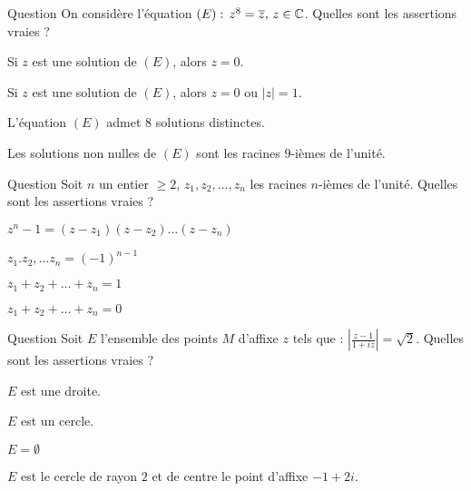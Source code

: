 \begin{multi}[multiple,feedback=
{Remarquer que si \(z\) est une solution  de \((E)\), \(|z|^8=|\overline{z}|=|z|\), donc si \(z\) n'est pas nul,  \(|z|=1\).
Par conséquent, \(z\) est une solution non nulle de \((E)\) si et seulement si  \(z^9=z\overline{z}=1\).
}]{Question}
On considère l'équation \((E) : \, z^8= \overline{z}, \, z\in \mathbb{C}\). Quelles sont les assertions vraies ?

    \item Si \(z\) est une solution de \((E)\), alors \(z=0\).
    \item* Si \(z\) est une solution de \((E)\), alors \(z=0\) ou \(|z|=1\).
    \item L'équation \((E)\) admet \(8\) solutions distinctes.
    \item* Les solutions non nulles de \((E)\) sont les racines \(9\)-ièmes de l'unité.
\end{multi}


\begin{multi}[multiple,feedback=
{\(z_1,z_2, \dots, z_n\) sont les racines dans \(\Cc\) du polynôme \(P(X) =X^n-1\), donc \(P(X)=(X-z_1)(X-z_2)\dots (X-z_n)\). 
On examine le coefficient de \(X^{n-1}\) et le coefficient constant.
}]{Question}
Soit \(n\) un entier \(\ge 2\), \(z_1,z_2, \dots, z_n\) les racines \(n\)-ièmes de l'unité. Quelles sont les assertions vraies ?

    \item* \(z^n-1=(z-z_1)(z-z_2)\dots (z-z_n)\)
    \item* \(z_1.z_2, \dots z_n = (-1)^{n-1}\)
    \item \(z_1+z_2+ \dots + z_n = 1\)
    \item* \(z_1+z_2+ \dots + z_n = 0\)
\end{multi}


\begin{multi}[multiple,feedback=
{Soit \(z \neq i\). On a :  \(|\frac{z-1}{1+iz}|=\sqrt 2 \Leftrightarrow |z-1|^2=2|1+iz|^2 \Leftrightarrow
(z-1)(\overline{z}-1)=2 (1+iz)(1-i\overline{z})\). On développe cette dernière égalité.
}]{Question}
Soit \(E\) l'ensemble des points \(M\) d'affixe \(z\) tels que : \(|\frac{z-1}{1+iz}|=\sqrt 2\). Quelles sont les assertions vraies ?

    \item \(E\) est une droite.
    \item* \(E\) est un cercle.
    \item \(E=\emptyset\)
    \item* \(E\) est le  cercle de rayon \(2\) et de centre le point d'affixe \(-1+2i\).
\end{multi}


